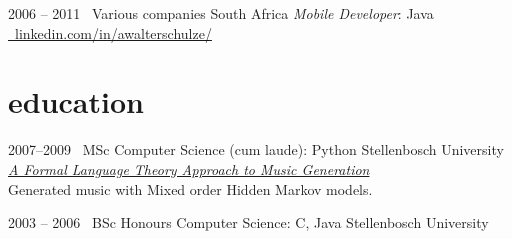 \documentclass[print]{friggeri-cv-a4} %
\begin{document}
\begin{entrylist}
\entry
{2006 -- 2011}
{\faMobile\ Various companies}
{South Africa}
{\emph{Mobile Developer}: Java \\
\href{https://www.linkedin.com/in/awalterschulze/}{\faLinkedinSquare\ linkedin.com/in/awalterschulze/}
}

\end{entrylist}

\section{education}

\begin{entrylist}


\entry
{2007--2009}
{\faMusic\ MSc {\normalfont Computer Science} (cum laude): {\normalfont Python}}
{Stellenbosch University}
{\href{http://superwillow.sourceforge.net/}{\emph{A Formal Language Theory Approach to Music Generation}} \\ Generated music with Mixed order Hidden Markov models.}

\entry
{2003 -- 2006}
{\faGraduationCap\ BSc Honours {\normalfont Computer Science: C, Java}}
{Stellenbosch University}
{}

\end{entrylist}
\end{document}
